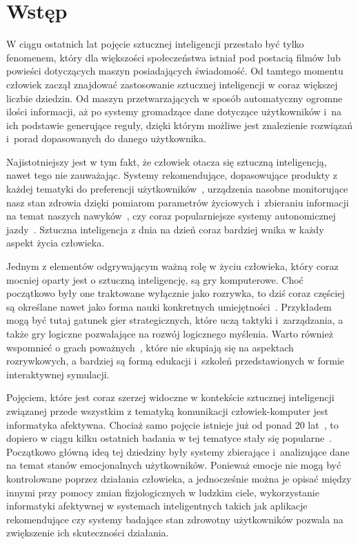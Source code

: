\chapter{Wstęp}
\label{cha:wstep}
W ciągu ostatnich lat pojęcie sztucznej inteligencji przestało być tylko fenomenem, który dla większości społeczeństwa istniał pod postacią filmów lub powieści dotyczących maszyn posiadających świadomość. Od tamtego momentu człowiek zaczął znajdować zastosowanie sztucznej inteligencji w coraz większej liczbie dziedzin. Od maszyn przetwarzających w sposób automatyczny ogromne ilości informacji, aż po systemy gromadzące dane dotyczące użytkowników i~na ich podstawie generujące reguły, dzięki którym możliwe jest znalezienie rozwiązań i~porad dopasowanych do danego użytkownika.

Najistotniejszy jest w tym fakt, że człowiek otacza się sztuczną inteligencją, nawet tego nie zauważając. Systemy rekomendujące, dopasowujące produkty z każdej tematyki do preferencji użytkowników~\cite{Gomez-Uribe:2015:NRS:2869770.2843948}, urządzenia nasobne monitorujące nasz stan zdrowia dzięki pomiarom parametrów życiowych i~zbieraniu informacji na temat naszych nawyków~\cite{wearable_computing_amft}, czy coraz popularniejsze systemy autonomicznej jazdy~\cite{dikmen_tesla_autopilot}. Sztuczna inteligencja z dnia na dzień coraz bardziej wnika w każdy aspekt życia człowieka. 

Jednym z elementów odgrywającym ważną rolę w życiu człowieka, który coraz mocniej oparty jest o sztuczną inteligencję, są gry komputerowe.  Choć początkowo były one traktowane wyłącznie jako rozrywka, to dziś coraz częściej są określane nawet jako forma nauki konkretnych umiejętności~\cite{oberdorfer_develop_your_strengths_by_gaming}. Przykładem mogą być tutaj gatunek gier strategicznych, które uczą taktyki i~zarządzania, a także gry logiczne pozwalające na rozwój logicznego myślenia. Warto również wspomnieć o grach poważnych~\cite{serious_games_michael_chen}, które nie skupiają się na aspektach rozrywkowych, a bardziej są formą edukacji i~szkoleń przedstawionych w formie interaktywnej symulacji.

Pojęciem, które jest coraz szerzej widoczne w kontekście sztucznej inteligencji związanej przede wszystkim z tematyką komunikacji człowiek-komputer jest informatyka afektywna. Chociaż samo pojęcie istnieje już od ponad 20 lat~\cite{Picard:1997:AC:265013}, to dopiero w ciągu kilku ostatnich badania w tej tematyce stały się popularne~\cite{gartner_hype_cycles_2018}. Początkowo główną ideą tej dziedziny były systemy zbierające i~analizujące dane na temat stanów emocjonalnych użytkowników. Ponieważ emocje nie mogą być kontrolowane poprzez działania człowieka, a jednocześnie można je opisać między innymi przy pomocy zmian fizjologicznych w ludzkim ciele, wykorzystanie informatyki afektywnej w systemach inteligentnych takich jak aplikacje rekomendujące czy systemy badające stan zdrowotny użytkowników pozwala na zwiększenie ich skuteczności działania.

